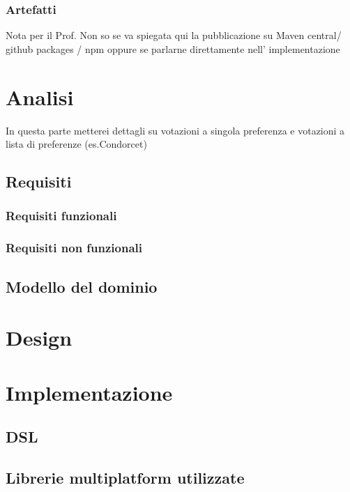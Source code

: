 \documentclass[12pt,a4paper,openright,twoside]{book}
\begin{document}
    \subsection{Artefatti}
    Nota per il Prof.
    Non so se va spiegata qui la pubblicazione su Maven central/ github packages / npm
    oppure se parlarne direttamente nell' implementazione
\chapter{Analisi}
In questa parte metterei dettagli su votazioni a singola preferenza 
e votazioni a lista di preferenze (es.Condorcet)
\section{Requisiti}

    \subsection{Requisiti funzionali}

    \subsection{Requisiti non funzionali}

\section{Modello del dominio}
\chapter{Design}
\chapter{Implementazione}

\section{DSL }

\section{Librerie multiplatform utilizzate}
\end{document}
